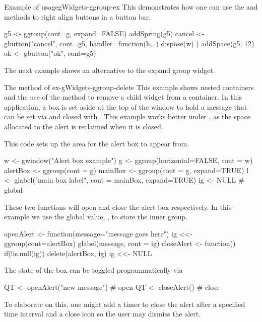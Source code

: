 \begin{example}{Example of  usage}{gWidgets-ggroup-ex}
This demonstrates how one can use the  and 
methods to right align buttons in a button bar.
\begin{Schunk}
\begin{Sinput}
 g5 <- ggroup(cont=g, expand=FALSE)
 addSpring(g5)
 cancel  <- gbutton("cancel", cont=g5, handler=function(h,..) {
   dispose(w)
 })
 addSpace(g5, 12)
 ok  <- gbutton("ok", cont=g5)
\end{Sinput}
\end{Schunk}
\end{example}

The next example shows an alternative to the expand group widget.

\begin{example}{The  method of }{ex-gWidgets-ggroup-delete}
This example shows nested  containers and the use of the
 method to remove a child widget from a
container. In this application, a box is set aside at the top of the
window to hold a message that can be set via  and
closed with . This example works better under
, as the space allocated to the alert is reclaimed when
it is closed.


This code sets up the area for the alert box to appear from.
\begin{Schunk}
\begin{Sinput}
 w <- gwindow("Alert box example")
 g <- ggroup(horizontal=FALSE, cont = w)
 alertBox <- ggroup(cont = g)
 mainBox <- ggroup(cont = g, expand=TRUE)
 l <- glabel("main box label", cont = mainBox, expand=TRUE)
 ig <- NULL                              # global
\end{Sinput}
\end{Schunk}

These two functions will open and close the alert box respectively. In
this example we use the global value, , to store the inner group.
\begin{Schunk}
\begin{Sinput}
 openAlert <- function(message="message goes here") {
   ig <<- ggroup(cont=alertBox)
   glabel(message, cont = ig)
 }
 closeAlert <- function() {
   if(!is.null(ig))
     delete(alertBox, ig)
   ig <<- NULL
 }
\end{Sinput}
\end{Schunk}

The state of the box can be toggled programmatically via
\begin{Schunk}
\begin{Sinput}
 QT <- openAlert("new message")                # open
 QT <- closeAlert()                            # close
\end{Sinput}
\end{Schunk}

To elaborate on this, one might add a timer to close the alert after a specified
time interval and a close icon so the user may dismiss the alert.
\end{example}


